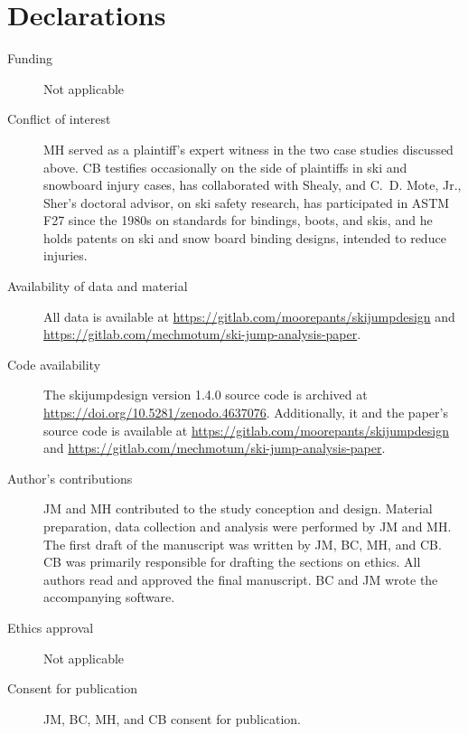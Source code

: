 \documentclass[smallextended]{svjour3}       %
\begin{document}
\section*{Declarations}
\begin{description}
  \item[Funding] Not applicable
  \item[Conflict of interest] MH served as a plaintiff's expert witness in the
    two case studies discussed above. CB testifies occasionally on the side of
    plaintiffs in ski and snowboard injury cases, has collaborated with Shealy,
    and C.~D. Mote, Jr., Sher's doctoral advisor, on ski safety research, has
    participated in ASTM F27 since the 1980s on standards for bindings, boots,
    and skis, and he holds patents on ski and snow board binding designs,
    intended to reduce injuries.
  \item[Availability of data and material] All data is available at
    \url{https://gitlab.com/moorepants/skijumpdesign} and
    \url{https://gitlab.com/mechmotum/ski-jump-analysis-paper}.
  \item[Code availability] The skijumpdesign version 1.4.0 source code is
    archived at \url{https://doi.org/10.5281/zenodo.4637076}. Additionally, it
    and the paper's source code is available at
    \url{https://gitlab.com/moorepants/skijumpdesign} and
    \url{https://gitlab.com/mechmotum/ski-jump-analysis-paper}.
  \item[Author's contributions] JM and MH contributed to the study conception
    and design. Material preparation, data collection and analysis were
    performed by JM and MH. The first draft of the manuscript was written by
    JM, BC, MH, and CB. CB was primarily responsible for drafting the sections
    on ethics. All authors read and approved the final manuscript. BC and JM
    wrote the accompanying software.
  \item[Ethics approval] Not applicable
  \item[Consent for publication] JM, BC, MH, and CB consent for publication.
\end{description}


\end{document}
